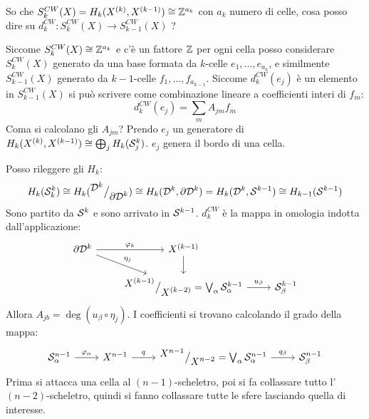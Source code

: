 \begin{osservation}
  So che $ S_k^{CW}(X) = H_k(X^{(k)}, X^{(k-1)}) \cong \mathbb{Z}^{a_k} $ con $ a_k $ numero di celle,
  cosa posso dire su $ d_k^{CW} \colon S_k^{CW}(X) \to S_{k-1}^{CW}(X) $ ?

  Siccome $ S_k^{CW}(X) \cong \mathbb{Z}^{a_k} $ e c'è un fattore $ \mathbb{Z} $ per ogni cella
  posso considerare $ S_k^{CW}(X) $ generato da una base formata da
  $ k $-celle $ e_1, \dots, e_{a_k} $, e similmente $ S_{k-1}^{CW}(X) $ generato
  da $ k - 1 $-celle $ f_1, \dots, f_{a_{k-1}} $. Siccome $ d_k^{CW}(e_j) $ è un elemento in
  $ S_{k-1}^{CW}(X) $ si può scrivere come combinazione lineare a coefficienti interi di $ f_m $:
  \[
    d^{CW}_k (e_j) = \sum_m A_{jm}f_m
  \]
  Coma si calcolano gli $ A_{jm} $?
  Prendo $ e_j $ un generatore di $ H_k(X^{(k)}, X^{(k-1)}) \cong \bigoplus_j H_k(\mathcal{S}^{k}_j) $.
  $ e_j $ genera il bordo di una cella.

  Posso rileggere gli $ H_k $:
  \[
    H_k(\mathcal{S}^{k}_k) \cong H_k({^{\textstyle \mathcal{D}^{k}}\big/_{\textstyle \partial \mathcal{D}^{k}}}) \cong H_k(\mathcal{D}^{k}, \partial \mathcal{D}^{k}) =
    H_k(\mathcal{D}^{k}, \mathcal{S}^{k-1}) \cong H_{k-1}(\mathcal{S}^{k-1})
  \]
  Sono partito da $ \mathcal{S}^{k} $ e sono arrivato in $ \mathcal{S}^{k-1} $.
  $ d_k^{CW} $ è la mappa in omologia indotta dall'applicazione:
  \[
    \begin{tikzcd}
      \partial \Disk{k} \rar{\phi_k} \arrow{dr}{\eta_j} & X^{(k-1)} \dar & {}\\
      {} & \quot{X^{(k-1)}}{X^{(k-2)}} = \bigvee_\alpha \Sph{k-1}_\alpha \rar{u_\beta} & \Sph{k-1}_\beta
    \end{tikzcd}
  \]
  Allora $ A_{jb} = \deg{(u_\beta \circ \eta_j)} $.
  I coefficienti si trovano calcolando il grado della mappa:
  \[
    \begin{tikzcd}
      \Sph{n-1}_\alpha \rar{\phi_\alpha} & X^{n-1} \rar{q} & \quot{X^{n-1}}{X^{n-2}} = \bigvee_\alpha \Sph{n-1}_\alpha  \rar{q_\beta} & \Sph{n-1}_\beta
    \end{tikzcd}
  \]
  Prima si attacca una cella al $ (n-1) $-scheletro, poi si fa collassare tutto
  l'$ (n-2) $-scheletro, quindi si fanno collassare tutte le sfere lasciando
  quella di interesse.
\end{osservation}


